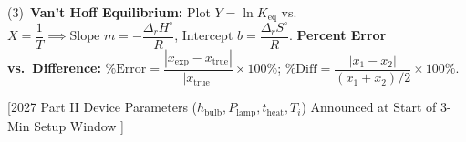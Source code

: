 \documentclass[10pt,twoside,openany,letterpaper]{book}
\begin{document}
\begin{quicksheet}
\begin{formulacard}
(3)~\textbf{Van't Hoff Equilibrium:} Plot $Y = \ln K_{\mathrm{eq}}$ vs.\ $X = \dfrac{1}{T} \implies \text{Slope } m = -\dfrac{\Delta_r H^\circ}{R}$, $\text{Intercept } b = \dfrac{\Delta_r S^\circ}{R}$.
\textbf{Percent Error vs.\ Difference:} $\%\text{Error} = \dfrac{|x_{\mathrm{exp}} - x_{\mathrm{true}}|}{|x_{\mathrm{true}}|}\times 100\%$; $\%\text{Diff} = \dfrac{|x_1 - x_2|}{(x_1+x_2)/2}\times 100\%$.
\end{formulacard}
\end{quicksheet}

\begin{quicksheet}\label{qr:12}
[2027 Part II Device Parameters ($h_{\mathrm{bulb}}, P_{\mathrm{lamp}}, t_{\mathrm{heat}}, T_i$) Announced at Start of 3-Min Setup Window ]


\end{quicksheet}
\end{document}

